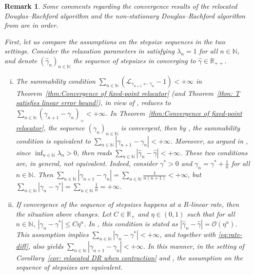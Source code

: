 \documentclass[a4paper,12pt]{article}
\newtheorem{remark}[theorem]{Remark}
\begin{document}
\begin{remark}\label{contrast to NDR}
Some comments regarding the convergence results of the relocated Douglas--Rachford algorithm and the non-stationary Douglas--Rachford algorithm from \cite{liang2017local}  are in order. 

First, let us compare the assumptions on the stepsize sequences in the two settings. Consider the relaxation parameters in \cite{liang2017local} satisfying $\lambda_n=1$ for all $n \in \mathbb{N}$, and denote $(\hat{\gamma}_n)_{n \in \mathbb{N}}$ the sequence of stepsizes in \cite{liang2017local} converging to $\hat{\gamma}\in \mathbb{R}_{++}$.\begin{enumerate}[(i)]
    \item The summability condition $\sum_{n \in \mathbb{N}} (\mathcal{L}_{\gamma_{n+1}\gets\gamma_n}-1) < +\infty$ in Theorem~\ref{thm:Convergence of fixed-point relocator} (and Theorem~\ref{thm: T satisfies linear error bound}), in view of \cite[Corollary 4.11]{atenas2025relocated}, reduces to $\sum_{n \in \mathbb{N}} (\gamma_{n+1}-\gamma_n)_+ < +\infty$. In Theorem~\ref{thm:Convergence of fixed-point relocator}, the sequence $(\gamma_n)_{n \in \mathbb{N}}$ is convergent, then by \cite[Remark~4.10]{atenas2025relocated}, the summability condition is equivalent to $\sum_{n \in \mathbb{N}} |\gamma_{n+1}-\gamma_n| < +\infty$. Moreover, as argued in \cite[Remark~4.1(iii)]{liang2017local}, since $\inf_{n \in \mathbb{N}} \lambda_n >0$, then \cite[(H.3)]{liang2017local} reads $\sum_{n \in \mathbb{N}} |\hat{\gamma}_n-\hat{\gamma}| < +\infty$. These two conditions are, in general, not equivalent. Indeed, consider $\gamma^* >0$ and $\gamma_n = \gamma^* + \frac{1}{n}$ for all $n \in \mathbb{N}$. Then $\sum_{n \in \mathbb{N}} |\gamma_{n+1}-\gamma_n| = \sum_{n \in \mathbb{N}} \frac{1}{n(n+1)} < +\infty$, but $\sum_{n \in \mathbb{N}} |\gamma_n-\gamma^*| = \sum_{n \in \mathbb{N}} \frac{1}{n} = +\infty $.
    
    \item If convergence of the sequence of stepsizes happens at a $R$-linear rate, then the situation above changes. Let $C \in \mathbb{R}_+$ and $\eta\in(0,1)$ such that for all $n \in \mathbb{N}$, $|\gamma_n - \gamma^*| \leq C \eta^n$. In \cite[Theorem~6.1]{liang2017local}, this condition is stated as $|\hat{\gamma}_n - \hat{\gamma}| = \mathcal{O}(\eta^n)$. This assumption implies $\sum_{n \in \mathbb{N}}|\gamma_n - \gamma^*| < +\infty$, and together with \eqref{eq:rate-diff}, also yields $\sum_{n \in \mathbb{N}} |\gamma_{n+1}-\gamma_n| < +\infty$. In this manner, in the setting of Corollary~\ref{cor: relocated DR when contraction} and  \cite[Theorem~6.1]{liang2017local}, the assumption on the sequence of stepsizes are equivalent. 
\end{enumerate}


\end{remark}
\end{document}

